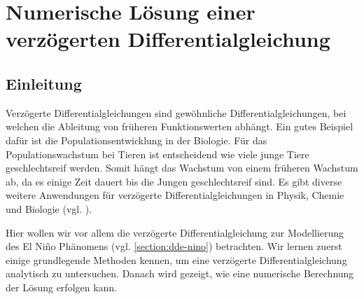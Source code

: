 %
%
%
\chapter{Numerische Lösung einer verzögerten Differentialgleichung\label{chapter:verzoegert}}
\begin{refsection}

\section{Einleitung}
Verzögerte Differentialgleichungen sind gewöhnliche Differentialgleichungen, bei welchen die Ableitung von früheren Funktionswerten abhängt.
Ein gutes Beispiel dafür ist die Populationsentwicklung in der Biologie. 
Für das Populationswachstum bei Tieren ist entscheidend wie viele junge Tiere geschlechtsreif werden.
Somit hängt das Wachstum von einem früheren Wachstum ab, da es einige Zeit dauert bis die Jungen geschlechtsreif sind.
Es gibt diverse weitere Anwendungen für verzögerte Differentialgleichungen in Physik, Chemie und Biologie (vgl. \cite{verzoegert:erneux}).

Hier wollen wir vor allem die verzögerte Differentialgleichung zur Modellierung des El Niño Phänomens (vgl. \ref{section:dde-nino}) betrachten.
Wir lernen zuerst einige grundlegende Methoden kennen, um eine verzögerte Differentialgleichung analytisch zu untersuchen. 
Danach wird gezeigt, wie eine numerische Berechnung der Lösung erfolgen kann.






\printbibliography[heading=subbibliography]
\end{refsection}
